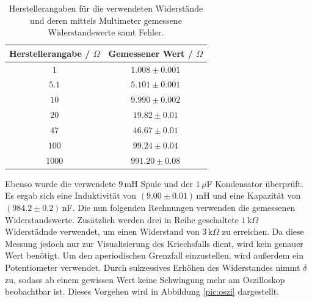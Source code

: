 \documentclass[a4paper, 12pt]{scrartcl}
\begin{document}
\begin{table}[H]
\centering
\begin{tabular}{c|c}
Herstellerangabe / $\Omega$ & Gemessener Wert / $\Omega$ \\
\hline
$1$ & $1.008 \pm 0.001$ \\
$5.1$ & $5.101 \pm 0.001$ \\
$10$ & $9.990 \pm 0.002$ \\
$20$ & $19.82 \pm 0.01$ \\
$47$ & $46.67 \pm 0.01$ \\
$100$ & $99.24 \pm 0.04$ \\
$1000$ & $991.20\pm 0.08$
\end{tabular}
\caption{Herstellerangaben für die verwendeten Widerstände und deren mittels Multimeter gemessene Widerstandswerte samt Fehler.}
\label{tab:widerstaende}
\end{table}
Ebenso wurde die verwendete $9 \,$mH Spule und der $1 \, \mu$F Kondensator überprüft. Es ergab sich eine Induktivität von $(9.00 \pm 0.01)\,$mH und eine Kapazität von $(984.2 \pm 0.2)\,$nF.
Die nun folgenden Rechnungen verwenden die gemessenen Widerstandswerte. Zusätzlich werden drei in Reihe geschaltete $1\,\text{k}\Omega$ Widerstädnde verwendet, um einen Widerstand von $3\,\text{k}\Omega$ zu erreichen. Da diese Messung jedoch nur zur Visualisierung des Kriechsfalls dient, wird kein genauer Wert benötigt. Um den aperiodischen Grenzfall einzustellen, wird außerdem ein Potentiometer verwendet. Durch sukzessives Erhöhen des Widerstandes nimmt $\delta$ zu, sodass ab einem gewissen Wert keine Schwingung mehr am Oszilloskop beobachtbar ist. Dieses Vorgehen wird in Abbildung \ref{pic:oszi} dargestellt.
\end{document}
